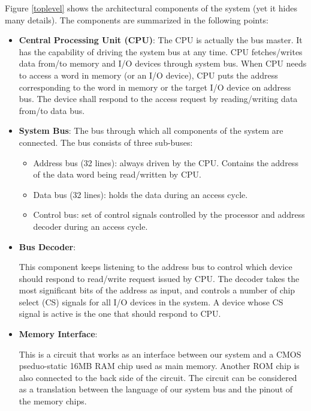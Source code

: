 \documentclass[oneside]{book}
\begin{document}
Figure \ref{toplevel} shows the architectural components of the system
(yet it hides many details). The components are summarized in the
following points:

\begin{itemize}

\item \textbf{Central Processing Unit (CPU)}:
The CPU is actually the bus master. It has the capability of
driving the system bus at any time. CPU fetches/writes data from/to
memory and I/O devices through system bus. When CPU needs to access
a word in memory (or an I/O device), CPU puts the address corresponding
to the word in memory or the target I/O device on address bus. The device
shall respond to the access request by reading/writing data from/to data
bus.

\item \textbf{System Bus}:
The bus through which all components of the system are connected. The bus
consists of three sub-buses:

\begin{itemize}

\item Address bus (32 lines): always driven by the CPU. Contains the address
of the data word being read/written by CPU.

\item Data bus (32 lines): holds the data during an access cycle.

\item Control bus: set of control signals controlled by the processor and
address decoder during an access cycle.

\end{itemize}

\item \textbf{Bus Decoder}:

This component keeps listening to the address bus to control which device
should respond to read/write request issued by CPU. The decoder takes
the most significant bits of the address as input, and controls a number
of chip select (CS) signals for all I/O devices in the system. A device
whose CS signal is active is the one that should respond to CPU.

\item \textbf{Memory Interface}:

This is a circuit that works as an interface between our system and a CMOS
pseduo-static 16MB RAM chip used as main memory. Another ROM chip is also
connected to the back side of the circuit. The circuit can be considered as
a translation between the language of our system bus and the pinout
of the memory chips.


\end{itemize}
\end{document}
